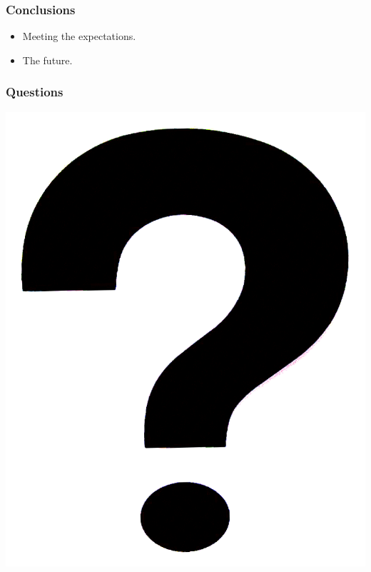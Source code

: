 \documentclass[12pt]{beamer}
\begin{document}
\begin{frame}
\vfill
  \frametitle{Conclusions}
  \begin{itemize}
    \item Meeting the expectations.
    \vfill
    \item The future.
    \vfill
  \end{itemize}
\vfill
\end{frame}

\begin{frame}
\vfill
  \frametitle{Questions}
  \begin{center}
    \vfill
    \includegraphics[scale=0.15]{images/questions.png}
    \vfill
  \end{center}
\vfill
\end{frame}
\end{document}
